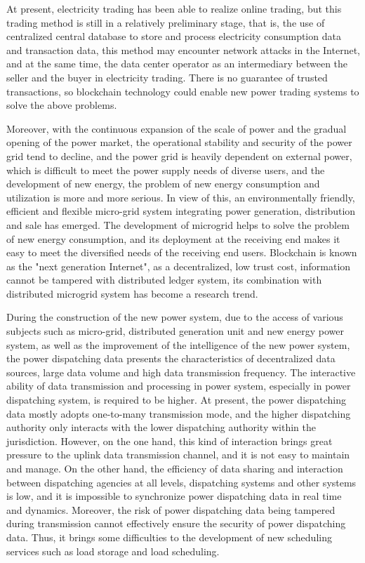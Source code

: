 \documentclass[lettersize,journal]{IEEEtran}
\begin{document}
At present, electricity trading has been able to realize online trading, but this trading method is still in a relatively preliminary stage, that is, the use of centralized central database to store and process electricity consumption data and transaction data, this method may encounter network attacks in the Internet, and at the same time, the data center operator as an intermediary between the seller and the buyer in electricity trading. There is no guarantee of trusted transactions, so blockchain technology could enable new power trading systems to solve the above problems.

Moreover, with the continuous expansion of the scale of power and the gradual opening of the power market, the operational stability and security of the power grid tend to decline, and the power grid is heavily dependent on external power, which is difficult to meet the power supply needs of diverse users, and the development of new energy, the problem of new energy consumption and utilization is more and more serious. In view of this, an environmentally friendly, efficient and flexible micro-grid system integrating power generation, distribution and sale has emerged. The development of microgrid helps to solve the problem of new energy consumption, and its deployment at the receiving end makes it easy to meet the diversified needs of the receiving end users. Blockchain is known as the "next generation Internet", as a decentralized, low trust cost, information cannot be tampered with distributed ledger system, its combination with distributed microgrid system has become a research trend.

During the construction of the new power system, due to the access of various subjects such as micro-grid, distributed generation unit and new energy power system, as well as the improvement of the intelligence of the new power system, the power dispatching data presents the characteristics of decentralized data sources, large data volume and high data transmission frequency. The interactive ability of data transmission and processing in power system, especially in power dispatching system, is required to be higher. At present, the power dispatching data mostly adopts one-to-many transmission mode, and the higher dispatching authority only interacts with the lower dispatching authority within the jurisdiction. However, on the one hand, this kind of interaction brings great pressure to the uplink data transmission channel, and it is not easy to maintain and manage. On the other hand, the efficiency of data sharing and interaction between dispatching agencies at all levels, dispatching systems and other systems is low, and it is impossible to synchronize power dispatching data in real time and dynamics. Moreover, the risk of power dispatching data being tampered during transmission cannot effectively ensure the security of power dispatching data. Thus, it brings some difficulties to the development of new scheduling services such as load storage and load scheduling.
\end{document}
